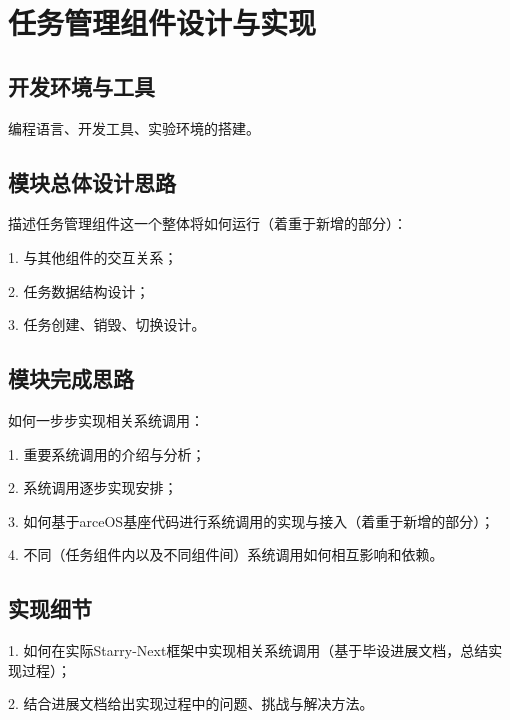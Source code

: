 
\chapter{任务管理组件设计与实现}

\section{开发环境与工具}

编程语言、开发工具、实验环境的搭建。



\section{模块总体设计思路}

描述任务管理组件这一个整体将如何运行（着重于新增的部分）：

1. 与其他组件的交互关系；

2. 任务数据结构设计；

3. 任务创建、销毁、切换设计。



\section{模块完成思路}

如何一步步实现相关系统调用：

1. 重要系统调用的介绍与分析；

2. 系统调用逐步实现安排；

3. 如何基于arceOS基座代码进行系统调用的实现与接入（着重于新增的部分）；

4. 不同（任务组件内以及不同组件间）系统调用如何相互影响和依赖。



\section{实现细节}

1. 如何在实际Starry-Next框架中实现相关系统调用（基于毕设进展文档，总结实现过程）；

2. 结合进展文档给出实现过程中的问题、挑战与解决方法。
